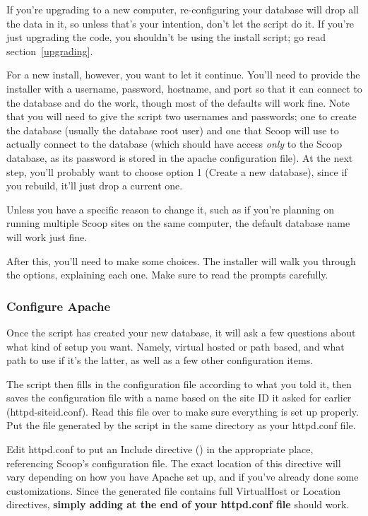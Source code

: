 If you're upgrading to a new computer, re-configuring your database will drop all the data in it, so unless that's your intention, don't let the script do it.  If you're just upgrading the code, you shouldn't be using the install script; go read section~\ref{upgrading}.

For a new install, however, you want to let it continue.  You'll need to provide the installer with a username, password, hostname, and port so that it can connect to the database and do the work, though most of the defaults will work fine. Note that you will need to give the script two usernames and passwords; one to create the database (usually the database root user) and one that Scoop will use to actually connect to the database (which should have access {\em only} to the Scoop database, as its password is stored in the apache configuration file). At the next step, you'll probably want to choose option 1 (Create a new database), since if you rebuild, it'll just drop a current one.

Unless you have a specific reason to change it, such as if you're planning on running multiple Scoop sites on the same computer, the default database name will work just fine.

After this, you'll need to make some choices. The installer will walk you through the options, explaining each one. Make sure to read the prompts carefully.


\subsubsection{Configure Apache}

Once the script has created your new database, it will ask a few questions about what kind of setup you want.  Namely, virtual hosted or path based, and what path to use if it's the latter, as well as a few other configuration items.

The script then fills in the configuration file according to what you told it, then saves the configuration file with a name based on the site ID it asked for earlier (httpd-\latexhtml{$<$}{<}siteid\latexhtml{$>$}{>}.conf).  Read this file over to make sure everything is set up properly.  Put the file generated by the script in the same directory as your httpd.conf file.

Edit httpd.conf to put an Include directive () in the appropriate place, referencing Scoop's configuration file.  The exact location of this directive will vary depending on how you have Apache set up, and if you've already done some customizations.  Since the generated file contains full \latexhtml{$<$}{<}VirtualHost\latexhtml{$>$}{>} or \latexhtml{$<$}{<}Location\latexhtml{$>$}{>} directives, {\bf simply adding at the end of your httpd.conf file} should work.

